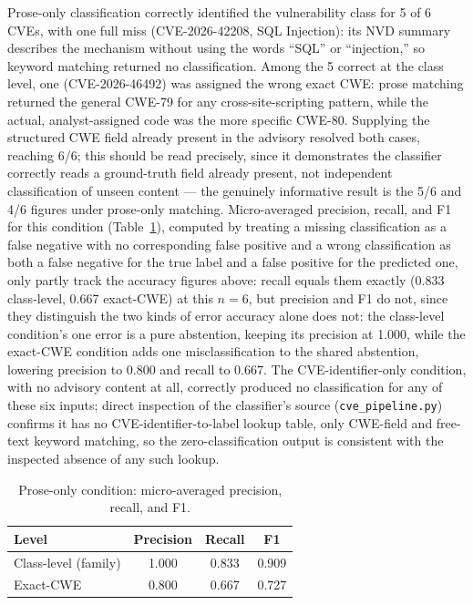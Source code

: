 \documentclass[12pt,a4paper]{report}
\begin{document}
Prose-only classification correctly identified the vulnerability class for 5 of 6 CVEs, with one full miss (CVE-2026-42208, SQL Injection): its NVD summary describes the mechanism without using the words ``SQL'' or ``injection,'' so keyword matching returned no classification. Among the 5 correct at the class level, one (CVE-2026-46492) was assigned the wrong exact CWE: prose matching returned the general CWE-79 for any cross-site-scripting pattern, while the actual, analyst-assigned code was the more specific CWE-80. Supplying the structured CWE field already present in the advisory resolved both cases, reaching 6/6; this should be read precisely, since it demonstrates the classifier correctly reads a ground-truth field already present, not independent classification of unseen content — the genuinely informative result is the 5/6 and 4/6 figures under prose-only matching. Micro-averaged precision, recall, and F1 for this condition (Table~\ref{tab:ablation-prf}), computed by treating a missing classification as a false negative with no corresponding false positive and a wrong classification as both a false negative for the true label and a false positive for the predicted one, only partly track the accuracy figures above: recall equals them exactly (0.833 class-level, 0.667 exact-CWE) at this $n=6$, but precision and F1 do not, since they distinguish the two kinds of error accuracy alone does not: the class-level condition's one error is a pure abstention, keeping its precision at 1.000, while the exact-CWE condition adds one misclassification to the shared abstention, lowering precision to 0.800 and recall to 0.667. The CVE-identifier-only condition, with no advisory content at all, correctly produced no classification for any of these six inputs; direct inspection of the classifier's source (\texttt{cve\_pipeline.py}) confirms it has no CVE-identifier-to-label lookup table, only CWE-field and free-text keyword matching, so the zero-classification output is consistent with the inspected absence of any such lookup.

\begin{table}[H]
\centering
\caption{Prose-only condition: micro-averaged precision, recall, and F1.}
\label{tab:ablation-prf}
\begin{tabular}{@{}lccc@{}}
\toprule
\textbf{Level} & \textbf{Precision} & \textbf{Recall} & \textbf{F1} \\
\midrule
Class-level (family) & 1.000 & 0.833 & 0.909 \\
Exact-CWE & 0.800 & 0.667 & 0.727 \\
\bottomrule
\end{tabular}
\end{table}
\end{document}
